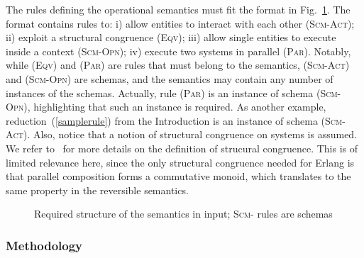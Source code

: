 \documentclass{article}[12pt,a4paper]
\theoremstyle{definition}
\newcommand{\paral}{\;|\;}
\begin{document}

The rules defining the operational semantics must fit the format in Fig.~\ref{fig:forwardrules}.
The format contains rules to: i) allow entities to interact with each other (\textsc{Scm-Act}); ii)
exploit a structural congruence (\textsc{Eqv}); iii) allow single entities to execute inside a context (\textsc{Scm-Opn});
iv) execute two systems in parallel (\textsc{Par}). Notably, while (\textsc{Eqv}) and (\textsc{Par}) are rules that must belong to the semantics, (\textsc{Scm-Act}) and (\textsc{Scm-Opn}) are schemas, and the semantics may contain any number of instances of the schemas. Actually, rule (\textsc{Par}) is an instance of schema (\textsc{Scm-Opn}), highlighting that such an instance is required. As another example, reduction~(\ref{samplerule}) from the Introduction is an instance of schema (\textsc{Scm-Act}).
Also, notice that a notion of structural congruence on systems is assumed.
We refer to~\cite{LaneseM20} for more details on the definition of strucural congruence. This is of limited relevance here, since the only structural congruence needed for Erlang is that parallel composition forms a commutative monoid, which translates to the same property in the reversible semantics.

\begin{figure}[t]
  {\footnotesize
    }
  \caption{Required structure of the semantics in input; \textsc{Scm-} rules are schemas}
  \label{fig:forwardrules}
\end{figure}

\subsubsection{Methodology}\label{sec:methodology}
\end{document}
